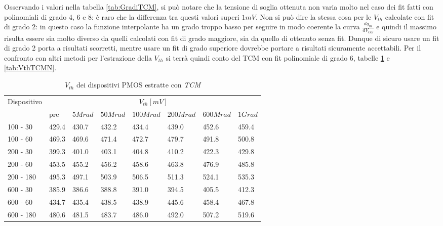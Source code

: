 \documentclass[12pt, letterpaper]{book}
\begin{document}
Osservando i valori nella tabella \ref{tab:GradiTCM}, si può notare che la tensione di soglia ottenuta non varia molto nel caso dei fit fatti con polinomiali di grado 4, 6 e 8: è raro che la differenza tra questi valori superi $1 mV$. Non si può dire la stessa cosa per le $V_{th}$ calcolate con fit di grado 2: in questo caso la funzione interpolante ha un grado troppo basso per seguire in modo coerente la curva $\frac{dg_m}{dV_{GS}}$ e quindi il massimo risulta essere sia molto diverso da quelli calcolati con fit di grado maggiore, sia da quello di ottenuto senza fit. Dunque di sicuro usare un fit di grado 2 porta a risultati scorretti, mentre usare un fit di grado superiore dovrebbe portare a risultati sicuramente accettabili. Per il confronto con altri metodi per l'estrazione della $V_{th}$ si terrà quindi conto del TCM con fit polinomiale di grado 6, tabelle \ref{tab:VthTCMP} e \ref{tab:VthTCMN}.


\begin{table}[H]
  \renewcommand{\arraystretch}{1.3}
    \begin{tabular}{m{2cm} m{0.8cm} m{1.1cm} m{1.3cm} m{1.5cm} m{1.5cm} m{1.5cm} m{1cm}}
      \toprule
      \multirow{2}{*}{Dispositivo} & \multicolumn{7}{c}{$V_{th} [mV] $}                                                                    \\
      \cmidrule{2-8}
                                   & pre                               & $5Mrad$ & $50Mrad$ & $100Mrad$ & $200Mrad$ & $600Mrad$ & $1Grad$ \\
      \midrule
      100 - 30               	& 429.4                             & 430.7   & 432.2    & 434.4     & 439.0     & 452.6     & 459.4   \\
      \hline
      100 - 60                 	& 469.3                             & 469.6   & 471.4    & 472.7     & 479.7     & 491.8     & 500.8   \\
      \hline
      200 - 30                  	& 399.3                             & 401.0   & 403.1    & 404.8     & 410.2     & 422.3     & 429.8   \\
      \hline
      200 - 60                    & 453.5                             & 455.2   & 456.2    & 458.6     & 463.8     & 476.9     & 485.8   \\
      \hline
      200 - 180 			& 495.3                             & 497.1   & 503.9    & 506.5     & 511.3     & 524.1     & 535.3   \\
      \hline
      600 - 30                  	& 385.9                             & 386.6   & 388.8    & 391.0     & 394.5     & 405.5     & 412.3   \\
      \hline
      600 - 60                    & 434.7                             & 435.4   & 438.5    & 438.9     & 445.6     & 458.4     & 467.8   \\
      \hline
      600 - 180              	& 480.6                             & 481.5   & 483.7    & 486.0     & 492.0     & 507.2     & 519.6   \\
      \bottomrule
    \end{tabular}
  \caption{$V_{th}$ dei dispositivi PMOS estratte con \emph{TCM}}
  \label{tab:VthTCMP}
\end{table}
\end{document}
